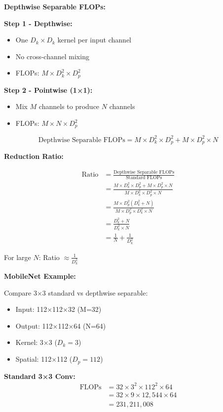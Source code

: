 \documentclass[12pt]{article}
\newcommand{\explanation}[1]{{\color{explanationcolor}#1}}
\begin{document}
\begin{enumerate}[(a)]
{    \textbf{Depthwise Separable FLOPs:}
    
    \explanation{
    \textbf{Step 1 - Depthwise:}
    \begin{itemize}
        \item One $D_k \times D_k$ kernel per input channel
        \item No cross-channel mixing
        \item FLOPs: $M \times D_k^2 \times D_p^2$
    \end{itemize}
    
    \textbf{Step 2 - Pointwise (1×1):}
    \begin{itemize}
        \item Mix $M$ channels to produce $N$ channels
        \item FLOPs: $M \times N \times D_p^2$
    \end{itemize}
    
    \[\boxed{\text{Depthwise Separable FLOPs} = M \times D_k^2 \times D_p^2 + M \times D_p^2 \times N}\]
    }
    
    \textbf{Reduction Ratio:}
    
    \explanation{
    \begin{align}
    \text{Ratio} &= \frac{\text{Depthwise Separable FLOPs}}{\text{Standard FLOPs}}\\
    &= \frac{M \times D_k^2 \times D_p^2 + M \times D_p^2 \times N}{M \times D_k^2 \times D_p^2 \times N}\\
    &= \frac{M \times D_p^2(D_k^2 + N)}{M \times D_p^2 \times D_k^2 \times N}\\
    &= \frac{D_k^2 + N}{D_k^2 \times N}\\
    &= \frac{1}{N} + \frac{1}{D_k^2}
    \end{align}
    
    For large $N$: Ratio $\approx \frac{1}{D_k^2}$
    }
    
    \textbf{MobileNet Example:}
    
    \explanation{
    Compare 3×3 standard vs depthwise separable:
    \begin{itemize}
        \item Input: 112×112×32 (M=32)
        \item Output: 112×112×64 (N=64)
        \item Kernel: 3×3 ($D_k=3$)
        \item Spatial: 112×112 ($D_p=112$)
    \end{itemize}
    
    \textbf{Standard 3×3 Conv:}
    \begin{align}
    \text{FLOPs} &= 32 \times 3^2 \times 112^2 \times 64\\
    &= 32 \times 9 \times 12,544 \times 64\\
    &= 231,211,008
    \end{align}
    
}}
\end{enumerate}
\end{document}
